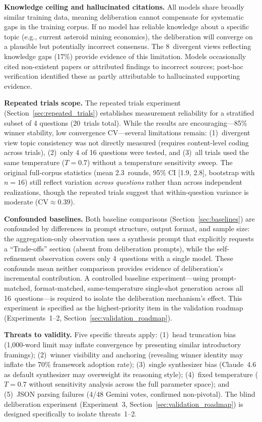 \documentclass[11pt,a4paper]{article}
\begin{document}
\textbf{Knowledge ceiling and hallucinated citations.} All models share broadly similar training data, meaning deliberation cannot compensate for systematic gaps in the training corpus. If no model has reliable knowledge about a specific topic (e.g., current asteroid mining economics), the deliberation will converge on a plausible but potentially incorrect consensus. The 8~divergent views reflecting knowledge gaps (17\%) provide evidence of this limitation. Models occasionally cited non-existent papers or attributed findings to incorrect sources; post-hoc verification identified these as partly attributable to hallucinated supporting evidence.

\textbf{Repeated trials scope.} The repeated trials experiment (Section~\ref{sec:repeated_trials}) establishes measurement reliability for a stratified subset of 4 questions (20~trials total). While the results are encouraging---85\% winner stability, low convergence CV---several limitations remain: (1)~divergent view topic consistency was not directly measured (requires content-level coding across trials), (2)~only 4 of 16 questions were tested, and (3)~all trials used the same temperature ($T = 0.7$) without a temperature sensitivity sweep. The original full-corpus statistics (mean 2.3~rounds, 95\% CI [1.9, 2.8], bootstrap with $n = 16$) still reflect variation \emph{across questions} rather than across independent realizations, though the repeated trials suggest that within-question variance is moderate ($\text{CV} \approx 0.39$).

\textbf{Confounded baselines.} Both baseline comparisons (Section~\ref{sec:baselines}) are confounded by differences in prompt structure, output format, and sample size: the aggregation-only observation uses a synthesis prompt that explicitly requests a ``Trade-offs'' section (absent from deliberation prompts), while the self-refinement observation covers only 4~questions with a single model. These confounds mean neither comparison provides evidence of deliberation's incremental contribution. A controlled baseline experiment---using prompt-matched, format-matched, same-temperature single-shot generation across all 16~questions---is required to isolate the deliberation mechanism's effect. This experiment is specified as the highest-priority item in the validation roadmap (Experiments~1--2, Section~\ref{sec:validation_roadmap}).

\textbf{Threats to validity.} Five specific threats apply: (1)~head truncation bias (1{,}000-word limit may inflate convergence by presenting similar introductory framings); (2)~winner visibility and anchoring (revealing winner identity may inflate the 70\% framework adoption rate); (3)~single synthesizer bias (Claude~4.6 as default synthesizer may overweight its reasoning style); (4)~fixed temperature ($T = 0.7$ without sensitivity analysis across the full parameter space); and (5)~JSON parsing failures (4/48 Gemini votes, confirmed non-pivotal). The blind deliberation experiment (Experiment~3, Section~\ref{sec:validation_roadmap}) is designed specifically to isolate threats~1--2.
\end{document}
